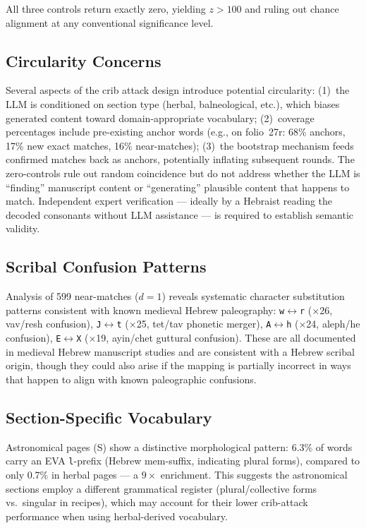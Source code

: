 \documentclass[11pt,a4paper]{article}
\newcommand{\eva}[1]{\texttt{#1}}
\begin{document}
All three controls return exactly zero, yielding $z>100$ and ruling out
chance alignment at any conventional significance level.

\subsection{Circularity Concerns}
\label{sec:crib-circularity}

Several aspects of the crib attack design introduce potential circularity:
(1)~the LLM is conditioned on section type (herbal, balneological, etc.),
which biases generated content toward domain-appropriate vocabulary;
(2)~coverage percentages include pre-existing anchor words (e.g., on
folio~27r: 68\% anchors, 17\% new exact matches, 16\% near-matches);
(3)~the bootstrap mechanism feeds confirmed matches back as anchors,
potentially inflating subsequent rounds.
The zero-controls rule out random coincidence but do not address whether
the LLM is ``finding'' manuscript content or ``generating'' plausible
content that happens to match. Independent expert verification ---
ideally by a Hebraist reading the decoded consonants without LLM
assistance --- is required to establish semantic validity.

\subsection{Scribal Confusion Patterns}

Analysis of 599 near-matches ($d=1$) reveals systematic character
substitution patterns consistent with known medieval Hebrew paleography:
\eva{w}$\leftrightarrow$\eva{r} ($\times$26, vav/resh confusion),
\eva{J}$\leftrightarrow$\eva{t} ($\times$25, tet/tav phonetic merger),
\eva{A}$\leftrightarrow$\eva{h} ($\times$24, aleph/he confusion),
\eva{E}$\leftrightarrow$\eva{X} ($\times$19, ayin/chet guttural confusion).
These are all documented in medieval Hebrew manuscript studies and are
consistent with a Hebrew scribal origin, though they could also arise
if the mapping is partially incorrect in ways that happen to align with
known paleographic confusions.

\subsection{Section-Specific Vocabulary}

Astronomical pages (S) show a distinctive morphological pattern: 6.3\% of
words carry an EVA \eva{l}-prefix (Hebrew mem-suffix, indicating plural
forms), compared to only 0.7\% in herbal pages --- a $9\times$ enrichment.
This suggests the astronomical sections employ a different grammatical
register (plural/collective forms vs.\ singular in recipes), which may
account for their lower crib-attack performance when using herbal-derived
vocabulary.
\end{document}
